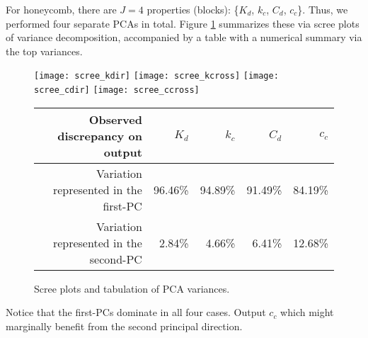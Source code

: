 \documentclass[12pt]{article}
\begin{document}
For honeycomb, there are $J=4$ properties (blocks):
\{$K_{d}$, $k_{c}$, $C_{d}$, $c_{c}$\}. Thus, we performed four separate PCAs
 in total.  Figure \ref{fig:scree} summarizes these via scree
plots of variance decomposition, accompanied by a table with a numerical
summary via the top variances.
\begin{figure}[ht!]
\centering
\texttt{[image: scree\_kdir]}
\texttt{[image: scree\_kcross]} 
\texttt{[image: scree\_cdir]}
\texttt{[image: scree\_ccross]}

\vspace{0.25cm}
\begin{tabular}{r | r | r | r | r}
Observed discrepancy  on output & $K_{d}$ & $k_{c}$ & $C_{d}$ & $c_{c}$  \\
\hline
Variation represented in the first-PC & 96.46\% & 94.89\% & 91.49\% & 84.19\% \\
Variation represented in the second-PC& 2.84\% & 4.66\% & 6.41\% & 12.68\% \\
\end{tabular}
\caption{Scree plots and tabulation of PCA variances.}%
\label{fig:scree}%
\end{figure}
Notice that the first-PCs dominate in all four cases.  Output
$c_c$ which might marginally benefit from the second principal direction.
\end{document}
